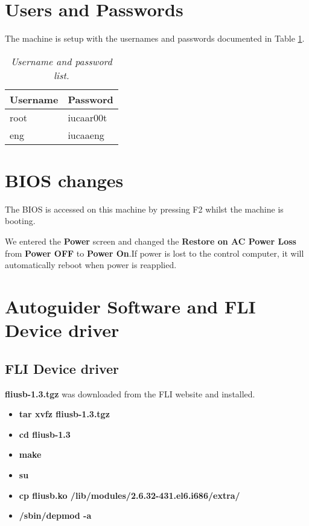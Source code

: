 \documentclass[10pt,a4paper]{article}
\begin{document}
\section{Users and Passwords}

The machine is setup with the usernames and passwords documented in Table \ref{tab:usernamespasswords}.

\begin{table}[!h]
\begin{center}
\begin{tabular}{|l|l|}
\hline
{\bf Username} & {\bf Password} \\ \hline
root & iucaar00t \\ \hline
eng & iucaaeng \\ \hline
\end{tabular}
\end{center}
\caption{\em Username and password list.}
\label{tab:usernamespasswords}
\end{table}

\section{BIOS changes}

The BIOS is accessed on this machine by pressing F2 whilst the machine is booting.

We entered the {\bf Power} screen and changed the {\bf Restore on AC Power Loss} from {\bf Power OFF} to {\bf Power On}.If power is lost to the control computer, it will automatically reboot when power is reapplied.

\section{Autoguider Software and FLI Device driver}

\subsection{FLI Device driver}

{\bf fliusb-1.3.tgz} was downloaded from the FLI website \cite{bib:flidevicedriver} and installed.

\begin{itemize}
\item {\bf tar xvfz fliusb-1.3.tgz}
\item {\bf cd fliusb-1.3}
\item {\bf make}
\item {\bf su}
\item {\bf cp fliusb.ko /lib/modules/2.6.32-431.el6.i686/extra/}
\item {\bf /sbin/depmod -a}
\end{itemize}
\end{document}
